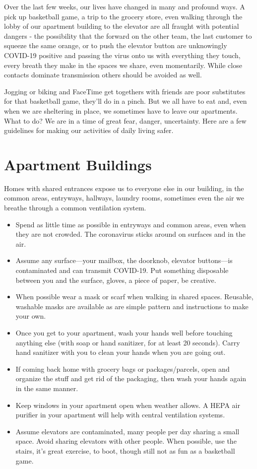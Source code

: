 \documentclass[onecolumn,journal]{IEEEtran}
\begin{document}
\begin{multicols}{2}



Over the last few weeks, our lives have changed in many and profound ways. A pick up basketball game, a trip to the grocery store,  even walking through the lobby of our apartment building to the elevator are all fraught with potential dangers  - the possibility that the forward on the other team, the last customer to squeeze the same orange, or to push the elevator button are unknowingly COVID-19 positive and passing the virus onto us with everything they touch, every breath they make in the spaces we share, even momentarily. While close contacts dominate transmission others should be avoided as well. 

Jogging or biking and FaceTime get togethers with friends are poor substitutes for that basketball game, they’ll do in a pinch.  But we all have to eat and, even when we are sheltering in place, we sometimes have to leave our apartments. What to do?
We are in a time of great fear, danger, uncertainty. Here are a few guidelines for making our activities of daily living safer.

\section*{Apartment Buildings}
Homes with shared entrances expose us to everyone else in our building, in the common areas, entryways, hallways, laundry rooms, sometimes even the air we breathe through a common ventilation system. 
\begin{itemize}
    \item Spend as little time as possible in entryways and common areas, even when they are not crowded. The coronavirus sticks around on surfaces and in the air. 
    \item Assume any surface---your mailbox, the doorknob, elevator buttons---is contaminated and can transmit COVID-19. Put something disposable between you and the surface, gloves, a piece of paper, be creative.
    \item When possible wear a mask or scarf when walking in shared spaces. Reusable, washable masks are available as are simple pattern and instructions to make your own. 
    \item Once you get to your apartment, wash your hands well before touching anything else (with soap or hand sanitizer, for at least 20 seconds). Carry hand sanitizer with you to clean your hands when you are going out. 
    \item If coming back home with grocery bags or packages/parcels, open and organize the stuff and get rid of the packaging, then wash your hands again in the same manner.
    \item Keep windows in your apartment open when weather allows. A HEPA air purifier in your apartment will help with central ventilation systems. 
    \item Assume elevators are contaminated, many people per day sharing a small space. Avoid sharing elevators with other people. When possible, use the stairs, it’s great exercise, to boot, though still not as fun as a basketball game. 
\end{itemize}


\end{multicols}
\end{document}
